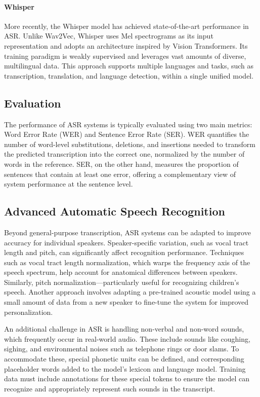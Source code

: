 \paragraph*{Whisper}
More recently, the Whisper model has achieved state-of-the-art performance in ASR. 
Unlike Wav2Vec, Whisper uses Mel spectrograms as its input representation and adopts an architecture inspired by Vision Transformers. 
Its training paradigm is weakly supervised and leverages vast amounts of diverse, multilingual data. 
This approach supports multiple languages and tasks, such as transcription, translation, and language detection, within a single unified model.

\subsection{Evaluation}
The performance of ASR systems is typically evaluated using two main metrics: Word Error Rate (WER) and Sentence Error Rate (SER).
WER quantifies the number of word-level substitutions, deletions, and insertions needed to transform the predicted transcription into the correct one, normalized by the number of words in the reference. 
SER, on the other hand, measures the proportion of sentences that contain at least one error, offering a complementary view of system performance at the sentence level.

\subsection{Advanced Automatic Speech Recognition}
Beyond general-purpose transcription, ASR systems can be adapted to improve accuracy for individual speakers. 
Speaker-specific variation, such as vocal tract length and pitch, can significantly affect recognition performance. 
Techniques such as vocal tract length normalization, which warps the frequency axis of the speech spectrum, help account for anatomical differences between speakers. 
Similarly, pitch normalization—particularly useful for recognizing children's speech. 
Another approach involves adapting a pre-trained acoustic model using a small amount of data from a new speaker to fine-tune the system for improved personalization.

An additional challenge in ASR is handling non-verbal and non-word sounds, which frequently occur in real-world audio. 
These include sounds like coughing, sighing, and environmental noises such as telephone rings or door slams. 
To accommodate these, special phonetic units can be defined, and corresponding placeholder words added to the model's lexicon and language model. 
Training data must include annotations for these special tokens to ensure the model can recognize and appropriately represent such sounds in the transcript.